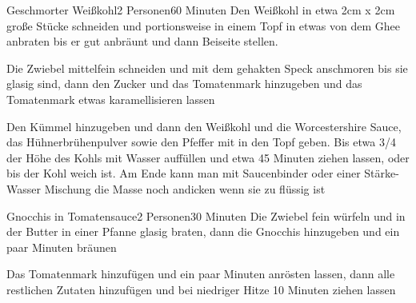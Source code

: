 
\begin{recipe}{Geschmorter Weißkohl}{2 Personen}{60 Minuten}
Den Weißkohl in etwa 2cm x 2cm große Stücke schneiden und portionsweise in einem Topf in etwas von dem Ghee anbraten bis er gut anbräunt und dann Beiseite stellen.

Die Zwiebel mittelfein schneiden und mit dem gehakten Speck anschmoren bis sie glasig sind, dann den Zucker und das Tomatenmark hinzugeben und das Tomatenmark etwas karamellisieren lassen

Den Kümmel hinzugeben und dann den Weißkohl und die Worcestershire Sauce, das Hühnerbrühenpulver sowie den Pfeffer mit in den Topf geben. Bis etwa 3/4 der Höhe des Kohls mit Wasser auffüllen und etwa 45 Minuten ziehen lassen, oder bis der Kohl weich ist. Am Ende kann man mit Saucenbinder oder einer Stärke-Wasser Mischung die Masse noch andicken wenn sie zu flüssig ist
\end{recipe}


\begin{recipe}{Gnocchis in Tomatensauce}{2 Personen}{30 Minuten}
Die Zwiebel fein würfeln und in der Butter in einer Pfanne glasig braten, dann die Gnocchis hinzugeben und ein paar Minuten bräunen

Das Tomatenmark hinzufügen und ein paar Minuten anrösten lassen, dann alle restlichen Zutaten hinzufügen und bei niedriger Hitze 10 Minuten ziehen lassen

\end{recipe}


